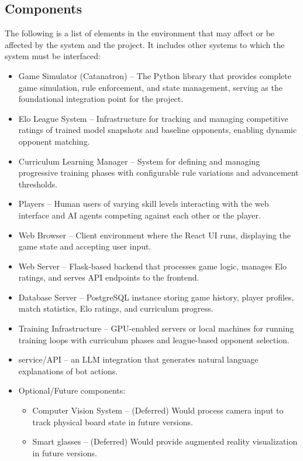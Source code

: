 \documentclass{article}
\begin{document}
\subsection{Components}\label{subsec:components2}
\raggedright The following is a list of elements in the environment that may affect or be affected by the system and the project.
It includes other systems to which the system must be interfaced:
\begin{itemize}
    \item {Game Simulator (Catanatron)} – The Python library that provides complete \emph{\Catan{}} game simulation, rule enforcement, and state management, serving as the foundational integration point for the project.
    \item {Elo League System} – Infrastructure for tracking and managing competitive ratings of trained model snapshots and baseline opponents, enabling dynamic opponent matching.
    \item {Curriculum Learning Manager} – System for defining and managing progressive training phases with configurable rule variations and advancement thresholds.
    \item {Players} – Human users of varying skill levels interacting with the web interface and AI agents competing against each other or the player.
    \item {Web Browser} – Client environment where the React UI runs, displaying the game state and accepting user input.
    \item {Web Server} – Flask-based backend that processes game logic, manages Elo ratings, and serves API endpoints to the frontend.
    \item {Database Server} – PostgreSQL instance storing game history, player profiles, match statistics, Elo ratings, and curriculum progress.
    \item {Training Infrastructure} – GPU-enabled servers or local machines for running \RL{} training loops with curriculum phases and league-based opponent selection.
    \item {\LLM{} service/API} – an LLM integration that generates natural language explanations of bot actions.
    \item {Optional/Future components:}
    \begin{itemize}
        \item {Computer Vision System} – (Deferred) Would process camera input to track physical board state in future versions.
        \item {Smart glasses} – (Deferred) Would provide augmented reality visualization in future versions.
    \end{itemize}
\end{itemize}
\end{document}
